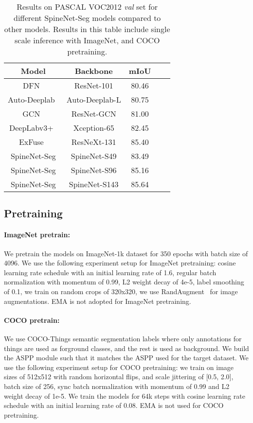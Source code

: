 \documentclass[10pt,twocolumn,letterpaper]{article}
\begin{document}
\setlength{\tabcolsep}{4pt}
\begin{table}[h!]
\centering
\begin{tabular}{c | c | c  c | c}
  \toprule
  Model & Backbone & mIoU  \\
  \midrule
  DFN~\cite{yu2018learning} & ResNet-101 & 80.46 \\
  Auto-Deeplab~\cite{autodeeplab} & Auto-Deeplab-L & 80.75 \\
  GCN~\cite{peng2017large} & ResNet-GCN & 81.00 \\
  DeepLabv3+~\cite{deeplabv3plus} & Xception-65 & 82.45\\
  ExFuse~\cite{zhang2018exfuse} & ResNeXt-131 & 85.40 \\
  \midrule
  SpineNet-Seg & SpineNet-S49 & 83.49 \\
  SpineNet-Seg & SpineNet-S96 & 85.16 \\
  SpineNet-Seg & SpineNet-S143 & 85.64 \\
  \bottomrule
\end{tabular}
\caption{Results on PASCAL VOC2012 \textit{val} set for different SpineNet-Seg models compared to other models. Results in this table include single scale inference with ImageNet, and COCO pretraining.}
\label{tab:pascal_model_scale} 
\end{table}


\subsection{Pretraining}
\paragraph{ImageNet pretrain:}
We pretrain the models on ImageNet-1k dataset for 350 epochs with batch size of 4096. We use the following experiment setup for ImageNet pretraining:  cosine learning rate schedule with an initial learning rate of 1.6, regular batch normalization with momentum of 0.99, L2 weight decay of 4e-5, label smoothing of 0.1, we train on random crops of 320x320, we use RandAugment~\cite{randaug} for image augmentations. EMA is not adopted for ImageNet pretraining.

\paragraph{COCO pretrain:}
We use COCO-Things semantic segmentation labels where only annotations for things are used as forground classes, and the rest is used as background. We build the ASPP module such that it matches the ASPP used for the target dataset. We use the following experiment setup for COCO pretraining: we train on image sizes of 512x512 with random horizontal flips, and scale jittering of [0.5, 2.0], batch size of 256, sync batch normalization with momentum of 0.99 and L2 weight decay of 1e-5. We train the models for 64k steps with cosine learning rate schedule with an initial learning rate of 0.08. EMA is not used for COCO pretraining.
\end{document}
